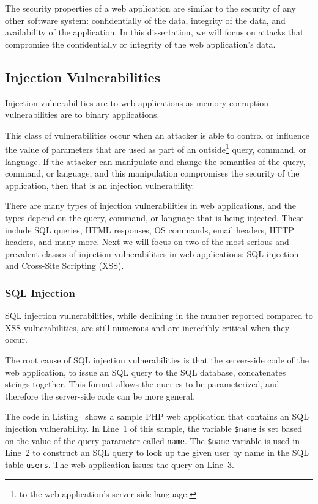 The security properties of a web application are similar to the
security of any other software system: confidentially of the data,
integrity of the data, and availability of the application. In this
dissertation, we will focus on attacks that compromise the
confidentially or integrity of the web application's data.

\subsection{Injection Vulnerabilities}

Injection vulnerabilities are to web applications as memory-corruption
vulnerabilities are to binary applications. 

This class of vulnerabilities occur when an attacker is able to
control or influence the value of parameters that are used as part of
an outside\footnote{to the web application's server-side language.}
query, command, or language. If the attacker can manipulate and change
the semantics of the query, command, or language, and this
manipulation compromises the security of the application, then that is
an injection vulnerability.

There are many types of injection vulnerabilities in web applications,
and the types depend on the query, command, or language that is being
injected. These include SQL queries, HTML responses, OS commands,
email headers, HTTP headers, and many more. Next we will focus on two
of the most serious and prevalent classes of injection vulnerabilities
in web applications: SQL injection and Cross-Site Scripting (XSS).

\subsubsection{SQL Injection}

SQL injection vulnerabilities, while declining in the number reported
compared to XSS vulnerabilities, are still numerous and are incredibly
critical when they occur.

The root cause of SQL injection vulnerabilities is that the
server-side code of the web application, to issue an SQL query to the
SQL database, concatenates strings together. This format allows the
queries to be parameterized, and therefore the server-side code can be
more general.



The code in Listing~ shows a sample PHP web
application that contains an SQL injection vulnerability. In Line~1 of
this sample, the variable \texttt{\$name} is set based on the value of
the query parameter called \texttt{name}. The \texttt{\$name} variable
is used in Line~2 to construct an SQL query to look up the given user
by name in the SQL table \texttt{users}. The web application issues
the query on Line~3.

